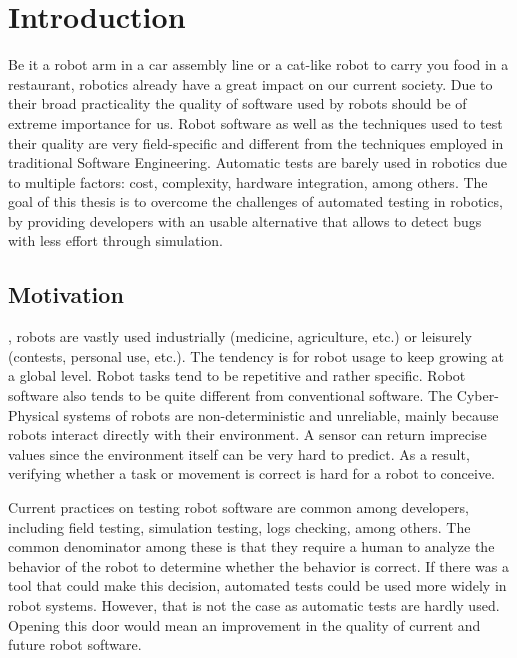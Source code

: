 \chapter{Introduction}
\label{chap:introduction}

Be it a robot arm in a car assembly line or a cat-like robot to carry you food 
in a restaurant, robotics already have a great impact on our current society. 
Due to their broad practicality the quality of software 
used by robots should be of extreme importance for us.
Robot software as well as the techniques used to test their quality are very 
field-specific and different from the techniques employed in traditional Software Engineering.
Automatic tests are barely used in robotics due to multiple factors:
cost, complexity, hardware integration, among others.
The goal of this thesis is to overcome the challenges of automated 
testing in robotics, by providing developers with an usable alternative 
that allows to detect bugs with less effort through simulation.

\section{Motivation}
\label{sec:motivation}

, robots are vastly used industrially (medicine, agriculture, etc.) 
or leisurely (contests, personal use, etc.).
The tendency is for robot usage to keep growing at a global level.
Robot tasks tend to be repetitive and rather specific.
 Robot software also tends to be quite different from conventional software.
The Cyber-Physical systems of robots are non-deterministic and unreliable, mainly because robots interact directly with their environment.
A sensor can return imprecise values since the environment itself can be very hard to predict.
As a result, verifying whether a task or movement is correct is hard for a robot to conceive.

\par

Current practices on testing robot software are common among developers, including field testing, simulation testing, logs checking, among others.
The common denominator among these is that they require a human to analyze the behavior of the robot to determine whether the behavior is correct. If there was a tool that could make this decision, automated tests could be used more widely in robot systems.
However, that is not the case as automatic tests are hardly used. Opening this door would mean an improvement 
in the quality of current and future robot software.



